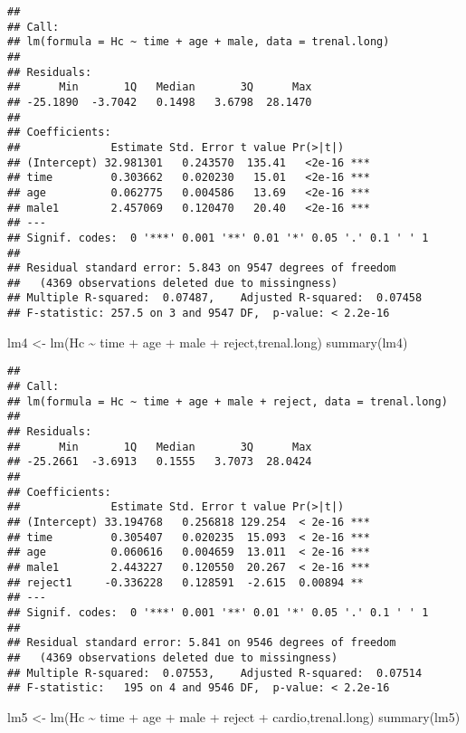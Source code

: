 \documentclass[
]{article}
\newenvironment{Shaded}{\begin{snugshade}}{\end{snugshade}}
\newcommand{\FunctionTok}[1]{\textcolor[rgb]{0.00,0.00,0.00}{#1}}
\newcommand{\NormalTok}[1]{#1}
\newcommand{\OtherTok}[1]{\textcolor[rgb]{0.56,0.35,0.01}{#1}}
\newcommand{\SpecialCharTok}[1]{\textcolor[rgb]{0.00,0.00,0.00}{#1}}
\begin{document}
\begin{verbatim}
## 
## Call:
## lm(formula = Hc ~ time + age + male, data = trenal.long)
## 
## Residuals:
##      Min       1Q   Median       3Q      Max 
## -25.1890  -3.7042   0.1498   3.6798  28.1470 
## 
## Coefficients:
##              Estimate Std. Error t value Pr(>|t|)    
## (Intercept) 32.981301   0.243570  135.41   <2e-16 ***
## time         0.303662   0.020230   15.01   <2e-16 ***
## age          0.062775   0.004586   13.69   <2e-16 ***
## male1        2.457069   0.120470   20.40   <2e-16 ***
## ---
## Signif. codes:  0 '***' 0.001 '**' 0.01 '*' 0.05 '.' 0.1 ' ' 1
## 
## Residual standard error: 5.843 on 9547 degrees of freedom
##   (4369 observations deleted due to missingness)
## Multiple R-squared:  0.07487,    Adjusted R-squared:  0.07458 
## F-statistic: 257.5 on 3 and 9547 DF,  p-value: < 2.2e-16
\end{verbatim}

\begin{Shaded}
\begin{Highlighting}[]
\NormalTok{lm4 }\OtherTok{\textless{}{-}} \FunctionTok{lm}\NormalTok{(Hc }\SpecialCharTok{\textasciitilde{}}\NormalTok{ time }\SpecialCharTok{+}\NormalTok{ age }\SpecialCharTok{+}\NormalTok{ male }\SpecialCharTok{+}\NormalTok{ reject,trenal.long)}
\FunctionTok{summary}\NormalTok{(lm4)}
\end{Highlighting}
\end{Shaded}

\begin{verbatim}
## 
## Call:
## lm(formula = Hc ~ time + age + male + reject, data = trenal.long)
## 
## Residuals:
##      Min       1Q   Median       3Q      Max 
## -25.2661  -3.6913   0.1555   3.7073  28.0424 
## 
## Coefficients:
##              Estimate Std. Error t value Pr(>|t|)    
## (Intercept) 33.194768   0.256818 129.254  < 2e-16 ***
## time         0.305407   0.020235  15.093  < 2e-16 ***
## age          0.060616   0.004659  13.011  < 2e-16 ***
## male1        2.443227   0.120550  20.267  < 2e-16 ***
## reject1     -0.336228   0.128591  -2.615  0.00894 ** 
## ---
## Signif. codes:  0 '***' 0.001 '**' 0.01 '*' 0.05 '.' 0.1 ' ' 1
## 
## Residual standard error: 5.841 on 9546 degrees of freedom
##   (4369 observations deleted due to missingness)
## Multiple R-squared:  0.07553,    Adjusted R-squared:  0.07514 
## F-statistic:   195 on 4 and 9546 DF,  p-value: < 2.2e-16
\end{verbatim}

\begin{Shaded}
\begin{Highlighting}[]
\NormalTok{lm5 }\OtherTok{\textless{}{-}} \FunctionTok{lm}\NormalTok{(Hc }\SpecialCharTok{\textasciitilde{}}\NormalTok{ time }\SpecialCharTok{+}\NormalTok{ age }\SpecialCharTok{+}\NormalTok{ male }\SpecialCharTok{+}\NormalTok{ reject }\SpecialCharTok{+}\NormalTok{ cardio,trenal.long)}
\FunctionTok{summary}\NormalTok{(lm5)}
\end{Highlighting}
\end{Shaded}
\end{document}
